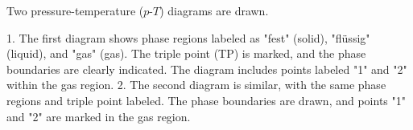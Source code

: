 Two pressure-temperature (\(p\)-\(T\)) diagrams are drawn.  

1. The first diagram shows phase regions labeled as "fest" (solid), "flüssig" (liquid), and "gas" (gas). The triple point (TP) is marked, and the phase boundaries are clearly indicated. The diagram includes points labeled "1" and "2" within the gas region.  
2. The second diagram is similar, with the same phase regions and triple point labeled. The phase boundaries are drawn, and points "1" and "2" are marked in the gas region.